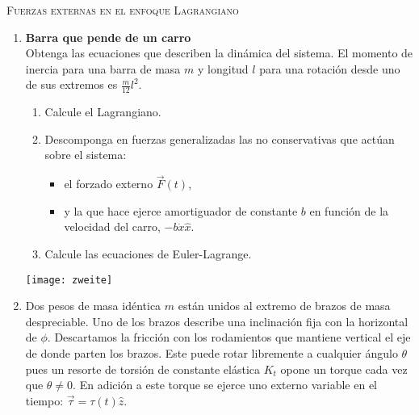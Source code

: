 \documentclass[11pt, spanish, a4paper, twoside]{article}
\begin{document}
\begin{center}
  \textsc{\large Fuerzas externas en el enfoque Lagrangiano}
\end{center}

\begin{enumerate}

\item 
\begin{minipage}[t][6.5cm]{0.55\textwidth}
\textbf{Barra que pende de un carro}\\
Obtenga las ecuaciones que describen la dinámica del sistema.
El momento de inercia para una barra de masa \(m\) y longitud \(l\) para una rotación desde uno de sus extremos es \(\frac{m}{12} l^2\). 
\begin{enumerate}
	\item Calcule el Lagrangiano.
	\item Descomponga en fuerzas generalizadas las no conservativas que actúan sobre el sistema:
	\begin{itemize}
		\item el forzado externo \(\vec{F}(t)\),
		\item y la que hace ejerce amortiguador de constante \(b\) en función de la velocidad del carro,  \(- b \dot{x} \hat{x}\).
	\end{itemize}
	\item Calcule las ecuaciones de Euler-Lagrange. 
\end{enumerate}
\end{minipage}
\begin{minipage}[c][0cm][t]{0.4\textwidth}
	\texttt{[image: zweite]}
\end{minipage}




\item 
\begin{minipage}[t][6cm]{0.6\textwidth}
Dos pesos de masa idéntica $m$ están unidos al extremo de brazos de masa despreciable.
Uno de los brazos describe una inclinación fija con la horizontal de $\phi$.
Descartamos la fricción con los rodamientos que mantiene vertical el eje de donde parten los brazos.
Este puede rotar libremente a cualquier ángulo $\theta$ pues un resorte de torsión de constante elástica $K_t$ opone un torque cada vez que $\theta \neq 0$.
En adición a este torque se ejerce uno externo variable en el tiempo: $\vec{\tau}= \tau (t) \hat{z}$.


\end{minipage}
\end{enumerate}
\end{document}
